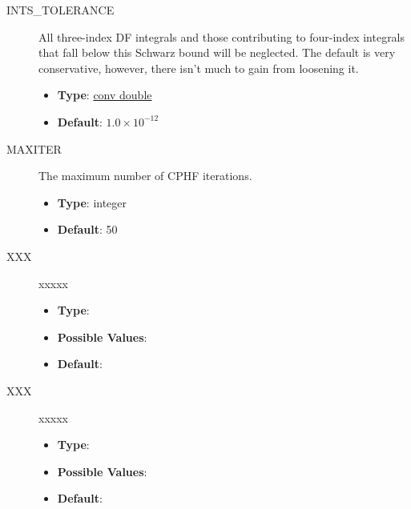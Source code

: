 \documentclass[letterpaper,10pt,english]{sphinxmanual}
\begin{document}
\begin{description}
\item[{INTS\_TOLERANCE}] \leavevmode{}\label{index:term-30}
All three-index DF integrals and those contributing to four-index
integrals that fall below this Schwarz bound will be neglected.
The default is very conservative, however, there isn't much to
gain from loosening it.
\begin{itemize}
\item {} 
\textbf{Type}: {\hyperref[index:conv-double]{conv double}}

\item {} 
\textbf{Default}: $1.0 \times 10^{-12}$

\end{itemize}

\end{description}
\begin{description}
\item[{MAXITER}] \leavevmode{}\label{index:term-31}
The maximum number of CPHF iterations.
\begin{itemize}
\item {} 
\textbf{Type}: integer

\item {} 
\textbf{Default}: 50

\end{itemize}

\end{description}
\begin{description}
\item[{XXX}] \leavevmode{}\label{index:term-32}
xxxxx
\begin{itemize}
\item {} 
\textbf{Type}:

\item {} 
\textbf{Possible Values}:

\item {} 
\textbf{Default}:

\end{itemize}

\end{description}
\begin{description}
\item[{XXX}] \leavevmode{}\label{index:term-33}
xxxxx
\begin{itemize}
\item {} 
\textbf{Type}:

\item {} 
\textbf{Possible Values}:

\item {} 
\textbf{Default}:

\end{itemize}

\end{description}
\end{document}

